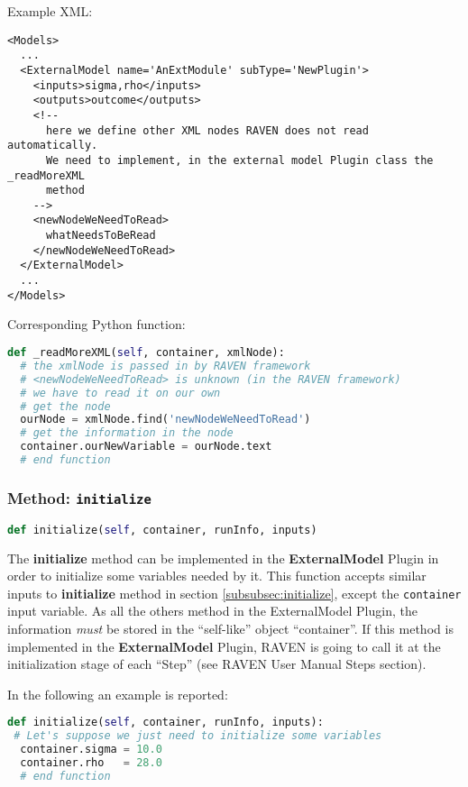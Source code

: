 Example XML:
\begin{lstlisting}[style=XML,morekeywords={subType,ModuleToLoad}]
<Models>
  ...
  <ExternalModel name='AnExtModule' subType='NewPlugin'>
    <inputs>sigma,rho</inputs>
    <outputs>outcome</outputs>
    <!--
      here we define other XML nodes RAVEN does not read automatically.
      We need to implement, in the external model Plugin class the _readMoreXML
      method
    -->
    <newNodeWeNeedToRead>
      whatNeedsToBeRead
    </newNodeWeNeedToRead>
  </ExternalModel>
  ...
</Models>
\end{lstlisting}

Corresponding Python function:
\begin{lstlisting}[language=python]
def _readMoreXML(self, container, xmlNode):
  # the xmlNode is passed in by RAVEN framework
  # <newNodeWeNeedToRead> is unknown (in the RAVEN framework)
  # we have to read it on our own
  # get the node
  ourNode = xmlNode.find('newNodeWeNeedToRead')
  # get the information in the node
  container.ourNewVariable = ourNode.text
  # end function
\end{lstlisting}

\subsubsection{Method: \texttt{initialize}}
\label{subsubsec:externalInitializeExternalModelPlugin}
\begin{lstlisting}[language=python]
def initialize(self, container, runInfo, inputs)
\end{lstlisting}

The \textbf{initialize} method can be implemented in the \textbf{ExternalModel} Plugin
in order to initialize some variables needed by it. This function accepts similar inputs
to \textbf{initialize} method in section \ref{subsubsec:initialize}, except the \texttt{container}
input variable. As all the others method in the ExternalModel Plugin, the information \emph{must} be
stored in the ``self-like'' object ``container''.
%
If this method is implemented in the \textbf{ExternalModel} Plugin, RAVEN is going to
call it at the initialization stage of each ``Step'' (see RAVEN User Manual Steps section).
%

In the following an example is reported:
\begin{lstlisting}[language=python]
def initialize(self, container, runInfo, inputs):
 # Let's suppose we just need to initialize some variables
  container.sigma = 10.0
  container.rho   = 28.0
  # end function
\end{lstlisting}
